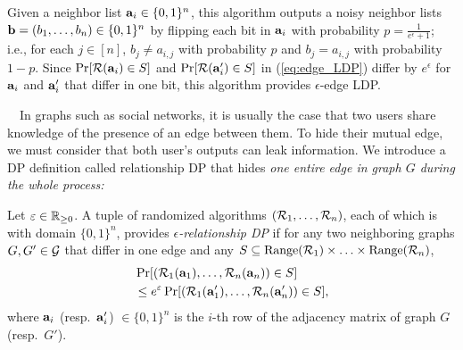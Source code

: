 Given a neighbor list 
$\mathbf{a}_i \in \{0,1\}^n$, 
this algorithm 
outputs a noisy neighbor lists 
$\mathbf{b} = (b_1, \ldots, b_n) \in \{0,1\}^n$ 
by flipping each bit in 
$\mathbf{a}_i$ 
with probability $p = \frac{1}{e^\epsilon + 1}$; i.e., for each $j \in [n]$, 
$b_j \neq a_{i,j}$ with probability $p$ and $b_j = a_{i,j}$ with probability $1-p$. 
Since 
$\Pr[\mathcal{R}(\mathbf{a}_i) \in S]$ and $\Pr[\mathcal{R}(\mathbf{a}'_i) \in S]$ 
in (\ref{eq:edge_LDP}) differ by $e^\epsilon$ for 
$\mathbf{a}_i$ and $\mathbf{a}'_i$ 
that differ in one bit, 
this algorithm 
provides $\epsilon$-edge LDP. 

\smallskip
~~In graphs such as social networks, 
it is usually the case that two users share knowledge of the presence of an edge between them. 
To hide their mutual edge, 
we must consider
that both user's outputs can leak information. 
We introduce a DP definition called relationship DP that hides \textit{one entire edge in graph $G$ during the whole process:}


\begin{definition}  
\label{def:entire_edge_LDP} 
Let $\varepsilon \in \mathbb{R}_{\ge0}$. 
A tuple of randomized algorithms $(\mathcal{R}_1, \ldots, \mathcal{R}_n)$, 
each of which is with domain $\{0,1\}^n$, 
provides 
\emph{$\epsilon$-relationship DP} 
if for any two 
neighboring 
graphs $G, G' \in \mathcal{G}$ that differ in one edge and any $S \subseteq \mathrm{Range}(\mathcal{R}_1) \times \ldots \times \mathrm{Range}(\mathcal{R}_n)$, 
\begin{align}
&\Pr[(\mathcal{R}_1(\mathbf{a}_1), \ldots, \mathcal{R}_n(\mathbf{a}_n)) \in S] \nonumber\\
&\leq e^\varepsilon \Pr[(\mathcal{R}_1(\mathbf{a}'_1), \ldots, \mathcal{R}_n(\mathbf{a}'_n)) \in S],
\label{eq:entire_edge_LDP}
\end{align}
where $\mathbf{a}_i$ (resp.~$\mathbf{a}'_i$) $\in \{0,1\}^n$ is the $i$-th row of the adjacency matrix of graph $G$ (resp.~$G'$).
\end{definition}

